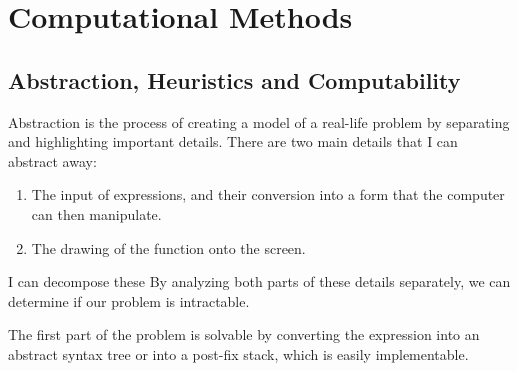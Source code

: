 \documentclass[../../../main.tex]{subfiles}
\begin{document}
\chapter{Computational Methods}

\section{Abstraction, Heuristics and Computability}
Abstraction is the process of creating a model of a real-life problem by separating and highlighting important details. There are two main details that I can abstract away:
\begin{enumerate}
\item The input of expressions, and their conversion into a form that the computer can then manipulate.
\item The drawing of the function onto the screen.
\end{enumerate}
I can decompose these 
By analyzing both parts of these details separately, we can determine if our problem is intractable.

The first part of the problem is solvable by converting the expression into an abstract syntax tree or into a post-fix stack, which is easily implementable.
\end{document}
